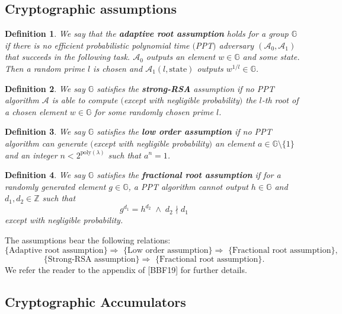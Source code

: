 \documentclass[11pt, lettersize, notitlepage, leqno, footskip=0.6cm]{article}
\newcommand{\bz}{\mathbb Z}
\newcommand{\imp}{\Longrightarrow}
\newcommand{\mc}{\mathcal}
\newcommand{\mb}{\mathbb}
\newcommand{\mr}{\mathrm}
\newcommand{\lam}{\lambda}
\newcommand{\vs}{\vspace{-0.15cm}}
\newcommand{\noin}{\noindent}
\newtheorem{Def}{Definition}[section]
\numberwithin{equation}{section}
\begin{document}
\subsection{\fontsize{11}{11} Cryptographic assumptions}

\begin{Def} We say that the \textbf{adaptive root assumption} holds for a group $\mb{G}$ if there is no efficient probabilistic polynomial time $($PPT$)$ adversary $(\mc{A}_0, \mc{A}_1)$ that succeeds in the following task. $\mc{A}_0$ outputs an element $w\in \mb{G}$ and some state. Then a random prime $l$ is chosen and $\mc{A}_1(l, \mr{state})$ outputs $w^{1/l}\in \mb{G}$. \end{Def}
 

\begin{Def} We say $\mb{G}$ satisfies the \textbf{strong-RSA} assumption if no PPT algorithm $\mc{A}$ is able to compute $($except with negligible probability$)$ the $l$-th root of a chosen element $w\in \mb{G}$ for some randomly chosen prime $l$.\end{Def}

\begin{Def} We say $\mb{G}$ satisfies the \textbf{low order assumption} if no PPT algorithm can generate $($except with negligible probability$)$ an element $a\in\mb{G}\setminus\{1\}$ and an integer $n< 2^{\mr{poly}(\lam)}$ such that $a^n = 1$.\end{Def}

\begin{Def} We say $\mb{G}$ satisfies the \textbf{fractional root assumption} if for a randomly generated element $g\in \mb{G}$, a PPT algorithm cannot output $h\in\mb{G}$ and $d_1,d_2\in\bz$ such that \vs $$g^{d_1} = h^{d_2}\;\wedge\; d_2 \nmid d_1$$ except with negligible probability.\end{Def}

\noin The assumptions bear the following relations: \vs $$\text{\{Adaptive root assumption\} }\imp \text{ \{Low order assumption\} } \imp \text{ \{Fractional root assumption\} },$$ \vspace{-0.6cm} $$\text{\{Strong-RSA assumption\} }\imp \text{ \{Fractional root assumption\}}. $$ We refer the reader to the appendix of [BBF19] for further details.

\subsection{\fontsize{11}{11}\selectfont Cryptographic Accumulators }
\end{document}
